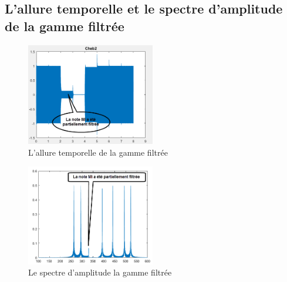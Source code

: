 \documentclass[twoside,twocolumn]{article}
\begin{document}
\subsection{L'allure temporelle et le spectre d'amplitude de la gamme filtrée}

\label{matlab}


\begin{figure}[H]
\centering
\includegraphics[width=0.5\textwidth]{Images/15.png}
\caption{ L'allure temporelle de la gamme filtrée}
\end{figure}

\begin{figure}[H]
\centering
\includegraphics[width=0.5\textwidth]{Images/13.png}
\caption{ Le spectre d'amplitude la gamme filtrée}
\end{figure}
\end{document}
